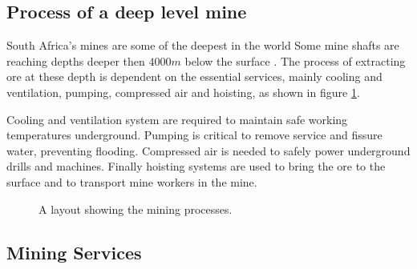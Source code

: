 	\subsection{Process of a deep level mine}
	South Africa's mines are some of the deepest in the world Some mine shafts are reaching depths deeper then $4000m$ below the surface \cite{vosloo2012case}. The process of extracting ore at these depth is dependent on the essential services, mainly cooling and ventilation, pumping, compressed air and hoisting, as shown in figure \ref{fig: Mining Layout}.
	\par 
	 Cooling and ventilation system are required to maintain safe working temperatures underground. Pumping is critical to remove service and fissure water, preventing flooding. Compressed air is needed to safely power underground drills and machines. Finally hoisting systems are used to bring the ore to the surface and to transport mine workers in the mine. 
		\begin{figure}[h!]
			\centering
			\caption{A layout showing the mining processes.}
			\label{fig: Mining Layout}
		\end{figure}
	\subsection{Mining Services}
